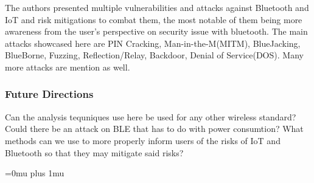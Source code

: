 \noindent
The authors presented multiple vulnerabilities and attacks against Bluetooth and IoT and risk mitigations to combat them, the most notable of them being more awareness from the user's perspective on security issue with bluetooth. The main attacks showcased here are PIN Cracking, Man-in-the-M(MITM), BlueJacking, BlueBorne, Fuzzing, Reflection/Relay, Backdoor, Denial of Service(DOS). Many more attacks are mention as well.

\subsubsection{Future Directions}

\noindent
Can the analysis tequniques use here be used for any other wireless standard? Could there be an attack on BLE that has to do with power consumtion? What methods can we use to more properly inform users of the risks of IoT and Bluetooth so that they may mitigate said risks?

\Urlmuskip=0mu plus 1mu\relax

\pagebreak
